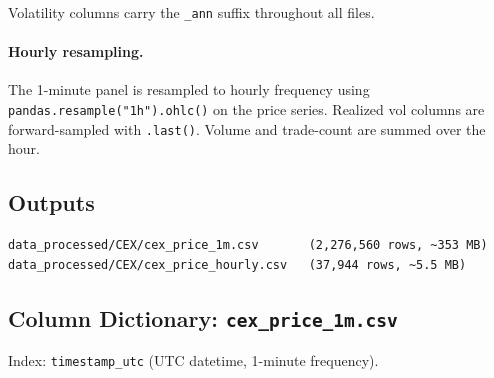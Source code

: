 \documentclass[11pt,a4paper]{article}
\begin{document}
Volatility columns carry the \texttt{\_ann} suffix throughout all files.

\paragraph{Hourly resampling.}
The 1-minute panel is resampled to hourly frequency using
\texttt{pandas.resample("1h").ohlc()} on the price series.
Realized vol columns are forward-sampled with \texttt{.last()}.
Volume and trade-count are summed over the hour.

\subsection{Outputs}

\begin{lstlisting}
data_processed/CEX/cex_price_1m.csv       (2,276,560 rows, ~353 MB)
data_processed/CEX/cex_price_hourly.csv   (37,944 rows, ~5.5 MB)
\end{lstlisting}

\subsection{Column Dictionary: \texttt{cex\_price\_1m.csv}}

Index: \texttt{timestamp\_utc} (UTC datetime, 1-minute frequency).
\end{document}
